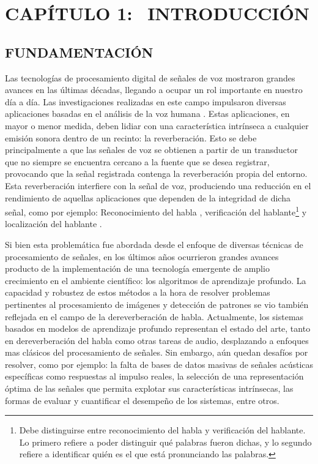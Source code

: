 \section[Introducción]{CAPÍTULO 1:$\ \ \ \ $INTRODUCCIÓN} 

\subsection[Fundamentación]{FUNDAMENTACIÓN}
Las tecnologías de procesamiento digital de señales de voz mostraron grandes avances en las últimas décadas, llegando a ocupar un rol importante en nuestro día a día. Las investigaciones realizadas en este campo impulsaron diversas aplicaciones basadas en el análisis de la voz humana \cite{fun1}\cite{fun2}. 
Estas aplicaciones, en mayor o menor medida, deben lidiar con una característica intrínseca a cualquier emisión sonora dentro de un recinto: la reverberación. Esto se debe principalmente a que las señales de voz se obtienen a partir de un transductor que no siempre se encuentra cercano a la fuente que se desea registrar, provocando que la señal registrada contenga la reverberación propia del entorno. Esta reverberación interfiere con la señal de voz, produciendo una reducción en el rendimiento de aquellas aplicaciones que dependen de la integridad de dicha señal, como por ejemplo: Reconocimiento del habla \cite{reconocimiento}, verificación del hablante\footnote{Debe distinguirse entre reconocimiento del habla y verificación del hablante. Lo primero refiere a poder distinguir qué palabras fueron dichas, y lo segundo refiere a identificar quién es el que está pronunciando las palabras.} \cite{verificacion} y localización del hablante \cite{localizacion}.

Si bien esta problemática fue abordada desde el enfoque de diversas técnicas de procesamiento de señales, en los últimos años ocurrieron grandes avances producto de la implementación de una tecnología emergente de amplio crecimiento en el ambiente científico: los algoritmos de aprendizaje profundo. La capacidad y robustez de estos métodos a la hora de resolver problemas pertinentes al procesamiento de imágenes y detección de patrones se vio también reflejada en el campo de la dereverberación de habla. Actualmente, los sistemas basados en modelos de aprendizaje profundo representan el estado del arte, tanto en dereverberación del habla como otras tareas de audio, desplazando a enfoques mas clásicos del procesamiento de señales. Sin embargo, aún quedan desafíos por resolver, como por ejemplo: la falta de bases de datos masivas de señales acústicas específicas como respuestas al impulso reales, la selección de una representación óptima de las señales que permita explotar sus características intrínsecas, las formas de evaluar y cuantificar el desempeño de los sistemas, entre otros.

